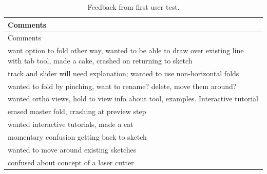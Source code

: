 \begin{longtable}[c]{@{}l@{}}
\caption{Feedback from first user test.}\tabularnewline
\toprule
\begin{minipage}[b]{0.82\columnwidth}\raggedright\strut
Comments
\strut\end{minipage}\tabularnewline
\midrule
\endfirsthead
\toprule
\begin{minipage}[b]{0.82\columnwidth}\raggedright\strut
Comments
\strut\end{minipage}\tabularnewline
\midrule
\endhead
\begin{minipage}[t]{0.82\columnwidth}\raggedright\strut
want option to fold other way, wanted to be able to draw over existing
line with tab tool, made a cake, crashed on returning to sketch
\strut\end{minipage}\tabularnewline
\begin{minipage}[t]{0.82\columnwidth}\raggedright\strut
track and slider will need explanation; wanted to use non-horizontal
folds
\strut\end{minipage}\tabularnewline
\begin{minipage}[t]{0.82\columnwidth}\raggedright\strut
wanted to fold by pinching, want to rename? delete, move them around?
\strut\end{minipage}\tabularnewline
\begin{minipage}[t]{0.82\columnwidth}\raggedright\strut
wanted ortho views, hold to view info about tool, examples. Interactive
tutorial
\strut\end{minipage}\tabularnewline
\begin{minipage}[t]{0.82\columnwidth}\raggedright\strut
erased master fold, crashing at preview step
\strut\end{minipage}\tabularnewline
\begin{minipage}[t]{0.82\columnwidth}\raggedright\strut
wanted interactive tutorials, made a cat
\strut\end{minipage}\tabularnewline
\begin{minipage}[t]{0.82\columnwidth}\raggedright\strut
momentary confusion getting back to sketch
\strut\end{minipage}\tabularnewline
\begin{minipage}[t]{0.82\columnwidth}\raggedright\strut
wanted to move around existing sketches
\strut\end{minipage}\tabularnewline
\begin{minipage}[t]{0.82\columnwidth}\raggedright\strut
confused about concept of a laser cutter
\strut\end{minipage}\tabularnewline

\end{longtable}
